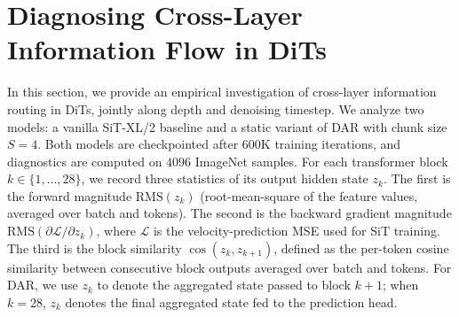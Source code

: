 \documentclass{llmxive}
\begin{document}

\section{Diagnosing Cross-Layer Information Flow in DiTs}   \label{sec:diagnose}

In this section, we provide an empirical investigation of cross-layer information routing in DiTs, jointly along depth and denoising timestep. 
We analyze two models: a vanilla SiT-XL/2 baseline and a static variant of \textsc{DAR} with chunk size $S = 4$. Both models are checkpointed after $600\text{K}$ training iterations, and diagnostics are computed on $4096$ ImageNet samples. For each transformer block $k \in \{1, \ldots, 28\}$, we record three statistics of its output hidden state $z_k$. The first is the forward magnitude $\mathrm{RMS}(z_k)$ (root-mean-square of the feature values, averaged over batch and tokens). The second is the backward gradient magnitude $\mathrm{RMS}(\partial\mathcal{L}/\partial z_k)$, where $\mathcal{L}$ is the velocity-prediction MSE used for SiT training. The third is the block similarity $\cos(z_k, z_{k+1})$, defined as the per-token cosine similarity between consecutive block outputs averaged over batch and tokens. For \textsc{DAR}, we use $z_k$ to denote the aggregated state passed to block $k+1$; when $k = 28$, $z_k$ denotes the final aggregated state fed to the prediction head.
\end{document}
